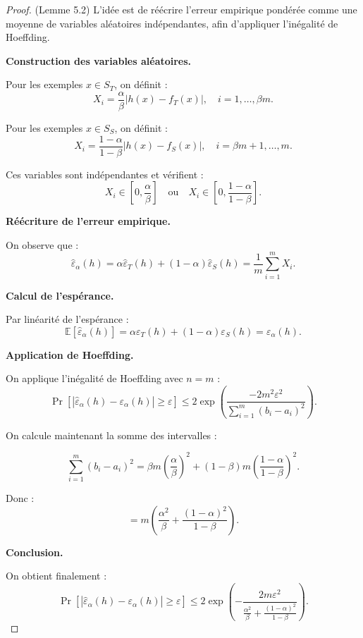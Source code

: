 \documentclass[a4paper,12pt]{article}
\theoremstyle{definition}
\theoremstyle{remark}
\begin{document}
\begin{proof}
(Lemme 5.2) L’idée est de réécrire l’erreur empirique pondérée comme une moyenne de variables aléatoires
indépendantes, afin d’appliquer l’inégalité de Hoeffding.

\medskip

\textbf{Construction des variables aléatoires.}

Pour les exemples $x \in S_T$, on définit :
\[
X_i = \frac{\alpha}{\beta} |h(x) - f_T(x)|, \quad i = 1, \dots, \beta m.
\]

Pour les exemples $x \in S_S$, on définit :
\[
X_i = \frac{1-\alpha}{1-\beta} |h(x) - f_S(x)|, \quad i = \beta m + 1, \dots, m.
\]

Ces variables sont indépendantes et vérifient :
\[
X_i \in \left[0, \frac{\alpha}{\beta}\right] \quad \text{ou} \quad
X_i \in \left[0, \frac{1-\alpha}{1-\beta}\right].
\]

\medskip

\textbf{Réécriture de l’erreur empirique.}

On observe que :
\[
\hat{\varepsilon}_\alpha(h)
= \alpha \hat{\varepsilon}_T(h) + (1-\alpha)\hat{\varepsilon}_S(h)
= \frac{1}{m} \sum_{i=1}^m X_i.
\]

\medskip

\textbf{Calcul de l’espérance.}

Par linéarité de l’espérance :
\[
\mathbb{E}[\hat{\varepsilon}_\alpha(h)]
= \alpha \varepsilon_T(h) + (1-\alpha)\varepsilon_S(h)
= \varepsilon_\alpha(h).
\]

\medskip

\textbf{Application de Hoeffding.}

On applique l’inégalité de Hoeffding avec $n = m$ :
\[
\Pr\left[
\left| \hat{\varepsilon}_\alpha(h) - \varepsilon_\alpha(h) \right| \geq \varepsilon
\right]
\leq 2 \exp\left(
\frac{-2m^2 \varepsilon^2}{\sum_{i=1}^m (b_i - a_i)^2}
\right).
\]

On calcule maintenant la somme des intervalles :

\[
\sum_{i=1}^m (b_i - a_i)^2
= \beta m \left(\frac{\alpha}{\beta}\right)^2
+ (1-\beta)m \left(\frac{1-\alpha}{1-\beta}\right)^2.
\]

Donc :
\[
= m \left( \frac{\alpha^2}{\beta} + \frac{(1-\alpha)^2}{1-\beta} \right).
\]

\medskip

\textbf{Conclusion.}

On obtient finalement :
\[
\Pr\left[ \left| \hat{\varepsilon}_\alpha(h) - \varepsilon_\alpha(h) \right| \geq \varepsilon \right]
\leq 2 \exp\left(
- \frac{2m \varepsilon^2}{\frac{\alpha^2}{\beta} + \frac{(1-\alpha)^2}{1-\beta}}
\right).
\]
\end{proof}
\end{document}

